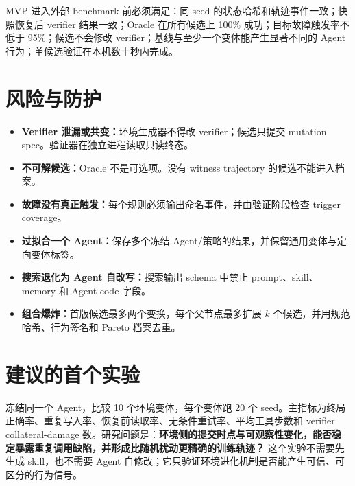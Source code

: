 \documentclass[11pt,a4paper,fontset=fandol]{ctexart}
\begin{document}
MVP 进入外部 benchmark 前必须满足：同 seed 的状态哈希和轨迹事件一致；快照恢复后 verifier 结果一致；Oracle 在所有候选上 100\% 成功；目标故障触发率不低于 95\%；候选不会修改 verifier；基线与至少一个变体能产生显著不同的 Agent 行为；单候选验证在本机数十秒内完成。

\section{风险与防护}

\begin{itemize}
  \item \textbf{Verifier 泄漏或共变：}环境生成器不得改 verifier；候选只提交 mutation spec。验证器在独立进程读取只读终态。
  \item \textbf{不可解候选：}Oracle 不是可选项。没有 witness trajectory 的候选不能进入档案。
  \item \textbf{故障没有真正触发：}每个规则必须输出命名事件，并由验证阶段检查 trigger coverage。
  \item \textbf{过拟合一个 Agent：}保存多个冻结 Agent/策略的结果，并保留通用变体与定向变体标签。
  \item \textbf{搜索退化为 Agent 自改写：}搜索输出 schema 中禁止 prompt、skill、memory 和 Agent code 字段。
  \item \textbf{组合爆炸：}首版候选最多两个变换，每个父节点最多扩展 $k$ 个候选，并用规范哈希、行为签名和 Pareto 档案去重。
\end{itemize}

\section{建议的首个实验}

冻结同一个 Agent，比较 10 个环境变体，每个变体跑 20 个 seed。主指标为终局正确率、重复写入率、恢复前读取率、无条件重试率、平均工具步数和 verifier collateral-damage 数。研究问题是：\textbf{环境侧的提交时点与可观察性变化，能否稳定暴露重复调用缺陷，并形成比随机扰动更精确的训练轨迹？} 这个实验不需要先生成 skill，也不需要 Agent 自修改；它只验证环境进化机制是否能产生可信、可区分的行为信号。
\end{document}
